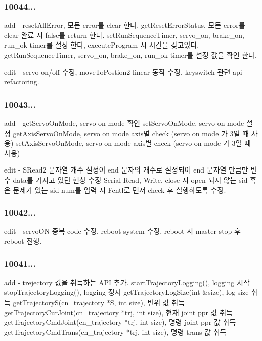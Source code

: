 \subsubsection*{10044...}

\begin{DoxyVerb}       add - resetAllError, 모든 error를 clear 한다.
             getResetErrorStatus, 모든 error를 clear 완료 시 false를 return 한다.
             setRunSequenceTimer, servo_on, brake_on, run_ok timer를 설정 한다, executeProgram 시 시간을 갖고있다.
             getRunSequenceTimer, servo_on, brake_on, run_ok timer를 설정 값을 확인 한다.

      edit - servo on/off 수정, moveToPostion2 linear 동작 수정, keyswitch 관련 api refactoring.
\end{DoxyVerb}


\subsubsection*{10043...}

\begin{DoxyVerb}       add - getServoOnMode, servo on mode 확인
             setServoOnMode, servo on mode 설정
             getAxisServoOnMode, servo on mode axis별 check (servo on mode 가 3일 때 사용)
             setAxisServoOnMode, servo on mode axis별 check (servo on mode 가 3일 때 사용)

      edit - SRead2 문자열 개수 설정이 end 문자의 개수로 설정되어 end 문자열 만큼만 변수 data를 가지고 있던 현상 수정
             Serial Read, Write, close 시 open 되지 않는 sid 혹은 문제가 있는 sid num를 입력 시 Fcntl로 먼저 check 후 실행하도록 수정.
\end{DoxyVerb}


\subsubsection*{10042...}

\begin{DoxyVerb}      edit - servoON 중복 code 수정, reboot system 수정, reboot 시 master stop 후 reboot 진행.
\end{DoxyVerb}


\subsubsection*{10041...}

\begin{DoxyVerb}      add  - trejectory 값을 취득하는 API 추가.
             startTrajectoryLogging(), logging 시작
             stopTrajectoryLogging(), logging 정지
             getTrajectoryLogSize(int &size), log size 취득
             getTrajectoryS(cn_trajectory *S, int size), 변위 값 취득
             getTrajectoryCurJoint(cn_trajectory *trj, int size), 현재 joint ppr 값 취득
             getTrajectoryCmdJoint(cn_trajectory *trj, int size), 명령 joint ppr 값 취득
             getTrajectoryCmdTrans(cn_trajectory *trj, int size), 명령 trans 값 취득
\end{DoxyVerb}


